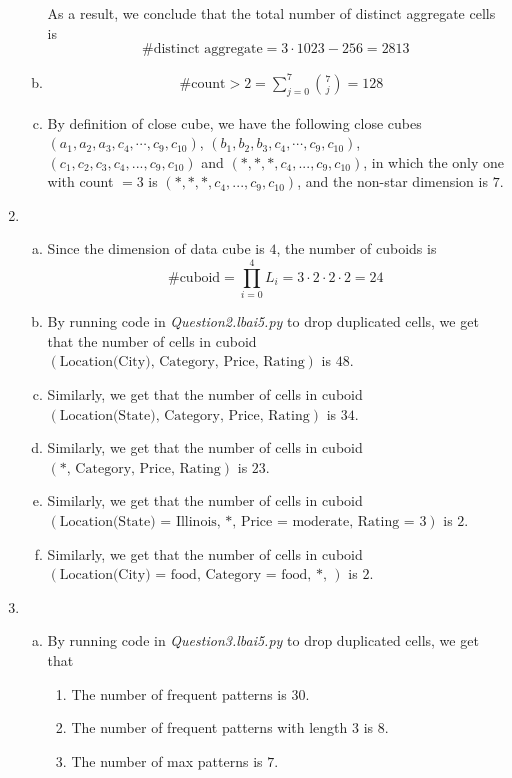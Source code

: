 \documentclass[11pt]{article}
\begin{document}
\begin{enumerate}
\begin{enumerate}[a.]
			As a result, we conclude that the total number of distinct aggregate cells is
			\[\# \text{distinct aggregate} = 3 \cdot 1023 - 256 = 2813\]
		\item 
			\begin{align}
 			&\# \text{count} > 2 = \sum_{j = 0}^{7} \binom{7}{j} = 128\nonumber
 			\end{align}
 		\item By definition of close cube, we have the following close cubes
 			$(a_1, a_2, a_3, c_4, \cdots, c_9, c_{10})$, $(b_1, b_2, b_3, c_4, \cdots, c_9, c_{10})$, $(c_1, c_2, c_3, c_4, ..., c_9, c_{10})$ and $(*, *, *, c_4, ..., c_9, c_{10})$, in which the only one with count $= 3$ is $(*, *, *, c_4, ..., c_9, c_{10})$, and the non-star dimension is $7$.
		\end{enumerate}
		\item
		\begin{enumerate}[a.]
		\item Since the dimension of data cube is $4$, the number of cuboids is
		\[\# \text{cuboid} = \prod_{i = 0}^4 L_i = 3 \cdot 2 \cdot 2 \cdot 2 = 24\]
		\item By running code in \textit{Question2.lbai5.py} to drop duplicated cells, we get that the number of cells in cuboid $(\text{Location(City), Category, Price, Rating})$ is $48$.
		\item Similarly, we get that the number of cells in cuboid $(\text{Location(State), Category, Price, Rating})$ is $34$.
		\item Similarly, we get that the number of cells in cuboid $(\text{*, Category, Price, Rating})$ is $23$.
		\item Similarly, we get that the number of cells in cuboid $(\text{Location(State) = Illinois, *, Price = moderate, Rating = 3})$ is $2$.
		\item Similarly, we get that the number of cells in cuboid $(\text{Location(City) = food, Category = food, *, })$ is $2$.
		\end{enumerate}
		\item 
		\begin{enumerate}[a.]
			\item
			By running code in \textit{Question3.lbai5.py} to drop duplicated cells, we get that 
			\begin{enumerate}[1.]
			\item The number of frequent patterns is $30$.
			\item The number of frequent patterns with length 3 is $8$.
			\item The number of max patterns is $7$.

\end{enumerate}
\end{enumerate}
\end{enumerate}
\end{document}
